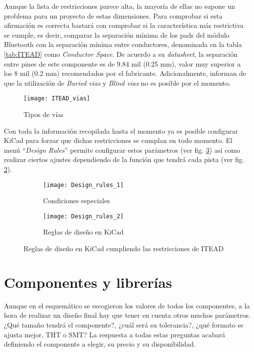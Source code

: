 Aunque la lista de restricciones parece alta, la mayoría de ellas no supone un problema para un proyecto de estas dimensiones. Para comprobar si esta afirmación es correcta bastará con comprobar si la característica más restrictiva se cumple, es decir, comparar la separación mínima de los pads del módulo Bluetooth con la separación mínima entre conductores, denominada en la tabla \ref{tab:ITEAD} como \textit{Conductor Space}. De acuerdo a su \textit{datasheet}, la separación entre pines de este componente es de 9.84 mil (0.25 mm), valor muy superior a los 8 mil (0.2 mm) recomendados por el fabricante.
\clearpage
Adicionalmente, informan de que la utilización de \textit{Buried vias} y \textit{Blind vias} no es posible por el momento.

\begin{figure} [h]
    \centering
    \texttt{[image: ITEAD\_vias]}
    \caption{Tipos de vías}
    \label{fig:ITEAD_vias}
\end{figure}

Con toda la información recopilada hasta el momento ya es posible configurar KiCad para forzar que dichas restricciones se cumplan en todo momento. El menú ``\textit{Design Rules}'' permite configurar estos parámetros (ver fig. \ref{fig:Design_rules_general}) así como realizar ciertos ajustes dependiendo de la función que tendrá cada pista (ver fig. \ref{fig:Design_rules_especial}).

\begin{figure}[h]
  \begin{subfigure}[b]{8cm}
   	\centering
    \texttt{[image: Design\_rules\_1]}
    \caption{Condiciones especiales}
    \label{fig:Design_rules_especial}
  \end{subfigure}
  \hfill
  \begin{subfigure}[b]{8cm}
  	\centering
    \texttt{[image: Design\_rules\_2]}
    \caption{Reglas de diseño en KiCad}
    \label{fig:Design_rules_general}
  \end{subfigure}
  \caption{Reglas de diseño en KiCad cumpliendo las restricciones de ITEAD}
  \label{fig:Design_rules}
\end{figure}

\clearpage

\section{Componentes y librerías\label{sec:Componentes_y_librerias}}

Aunque en el esquemático se escogieron los valores de todos los componentes, a la hora de realizar un diseño final hay que tener en cuenta otros muchos parámetros. ¿Qué tamaño tendrá el componente?, ¿cuál será su tolerancia?, ¿qué formato se ajusta mejor, \acrshort{THT} o \acrshort{SMT}? La respuesta a todas estas preguntas acabará definiendo el componente a elegir, su precio y su disponibilidad.

